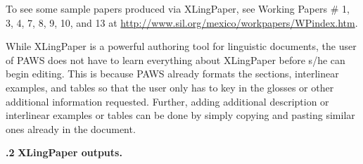 \documentclass[12pt]{article}
\begin{document}
{\vspace{\baselineskip}

{
}
{
}
{
}
{
}
\vspace{\baselineskip}
}\indent To see some sample papers produced via {XLingPaper}, see Working Papers \# 1, 3, 4, 7, 8, 9, 10, and 13 at \href{http://www.sil.org/mexico/workpapers/WPindex.htm}{http://www.sil.org/​mexico/​workpapers/​WPindex.htm}.\par{}\indent While {XLingPaper} is a powerful authoring tool for linguistic documents, the user of {PAWS} does not have to learn everything about {XLingPaper} before s/he can begin editing. This is because {PAWS} already formats the sections, interlinear examples, and tables so that the user only has to key in the glosses or other additional information requested. Further, adding additional description or interlinear examples or tables can be done by simply copying and pasting similar ones already in the document.\par{}\vspace{.25in}\noindent\protect\hypertarget{sXLingPaperOutputs}{{\noindent
\textbf{{.2 }}}}{\noindent
\textbf{{\protect\noindent
{XLingPaper} outputs. }}}
\end{document}

